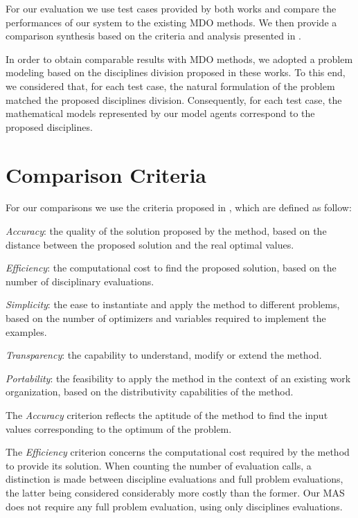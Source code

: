 For our evaluation we use test cases provided by both works and compare the performances of our system to the existing MDO methods. We then provide a comparison synthesis based on the criteria and analysis presented in \cite{perez2004evaluation}.

In order to obtain comparable results with MDO methods, we adopted a problem modeling based on the disciplines division proposed in these works. To this end, we considered that, for each test case, the natural formulation of the problem matched the proposed disciplines division. Consequently, for each test case, the mathematical models represented by our model agents correspond to the proposed disciplines.

\section{Comparison Criteria}

For our comparisons we use the criteria proposed in \cite{perez2004evaluation}, which are defined as follow:
\begin{compactitem}
\item \emph{Accuracy}: the quality of the solution proposed by the method, based on the distance between the proposed solution and the real optimal values.
\item \emph{Efficiency}: the computational cost to find the proposed solution, based on the number of disciplinary evaluations.
\item \emph{Simplicity}: the ease to instantiate and apply the method to different problems, based on the number of optimizers and variables required to implement the examples.
\item \emph{Transparency}: the capability to understand, modify or extend the method.
\item \emph{Portability}: the feasibility to apply the method in the context of an existing work organization, based on the distributivity capabilities of the method.
\end{compactitem}
 
The \emph{Accuracy} criterion reflects the aptitude of the method to find the input values corresponding to the optimum of the problem.
 
The \emph{Efficiency} criterion concerns the computational cost required by the method to provide its solution. When counting the number of evaluation calls, a distinction is made between discipline evaluations and full problem evaluations, the latter being considered considerably more costly than the former. Our MAS does not require any full problem evaluation, using only disciplines evaluations.
 

